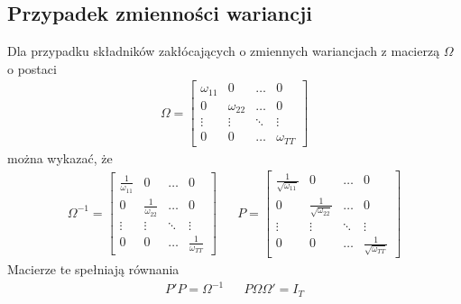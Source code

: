 \subsection{Przypadek zmienności wariancji}
Dla przypadku składników zakłócających o zmiennych wariancjach z macierzą $ \Omega $ o postaci
\begin{gather*}
\Omega=
\begin{bmatrix}
	\omega _{11} & 0             & \ldots & 0             \\
	0             & \omega _{22} & \ldots & 0             \\
	\vdots        & \vdots        & \ddots & \vdots        \\
	0             & 0             & \ldots & \omega _{TT}
\end{bmatrix}
\end{gather*}
można wykazać, że
\begin{align*}
\Omega^{-1}=
\begin{bmatrix}
	\frac{1}{\omega _{11}} & 0                       & \ldots & 0                       \\
	0                       & \frac{1}{\omega _{22}} & \ldots & 0                       \\
	\vdots                  & \vdots                  & \ddots & \vdots                  \\
	0                       & 0                       & \ldots & \frac{1}{\omega _{TT}}
\end{bmatrix}
&&
P=
\begin{bmatrix}
	\frac{1}{\sqrt{\omega _{11}}} & 0                       & \ldots & 0                       \\
	0                       & \frac{1}{\sqrt{\omega _{22}}} & \ldots & 0                       \\
	\vdots                  & \vdots                  & \ddots & \vdots                  \\
	0                       & 0                       & \ldots & \frac{1}{\sqrt{\omega _{TT}}}
\end{bmatrix}
\end{align*}
Macierze te spełniają równania
\begin{align*}
P'P=\Omega^{-1}
&&
P\Omega\Omega'=I_T
\end{align*}
